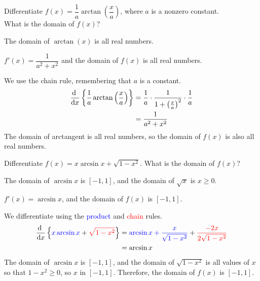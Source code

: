 \begin{question}
Differentiate $f(x)=\dfrac{1}{a}\arctan\left(\dfrac{x}{a}\right)$, where $a$ is a nonzero constant.\\ What is the domain of $f(x)$?
\end{question}
\begin{hint} The domain of $\arctan(x)$ is all real numbers.
\end{hint}
\begin{answer}
$f'(x)=\dfrac{1}{a^2+x^2}$ and the domain of $f(x)$ is all real numbers.
\end{answer}
\begin{solution}
We use the chain rule, remembering that $a$ is a constant.
\begin{align*}
\diff{}{x}\left\{\frac{1}{a}\arctan\left(\dfrac{x}{a}\right)\right\}&=
\frac{1}{a}\cdot\frac{1}{1+\left(\frac{x}{a}\right)^2}\cdot \frac{1}{a}\\
&=\frac{1}{a^2+x^2}
\end{align*}
The domain of arctangent is all real numbers, so the domain of $f(x)$ is also all real numbers.
\end{solution}




\begin{question}
Differentiate $f(x)=x\arcsin x + \sqrt{1-x^2}$. What is the domain of $f(x)$?
\end{question}
\begin{hint}
The domain of $\arcsin x$ is $[-1,1]$, and the domain of $\sqrt{x}$ is $x \geq 0$.
\end{hint}
\begin{answer}
$f'(x)=\arcsin x$, and the domain of $f(x)$ is $[-1,1]$.
\end{answer}
\begin{solution}
We differentiate using the \textcolor{blue}{product} and \textcolor{red}{chain} rules.
\begin{align*}
\diff{}{x}\left\{\textcolor{blue}{x\arcsin x} + \textcolor{red}{\sqrt{1-x^2}}\right\}&=
\textcolor{blue}{\arcsin x + \frac{x}{\sqrt{1-x^2}}}+\textcolor{red}{\frac{-2x}{2\sqrt{1-x^2}}}\\
&=\arcsin x
\end{align*}
The domain of $\arcsin x$ is $[-1,1]$, and the domain of $\sqrt{1-x^2}$ is all values of $x$ so that $1-x^2 \geq 0$, so $x$ in $[-1,1]$. Therefore, the domain of $f(x)$ is $[-1,1]$.
\end{solution}



